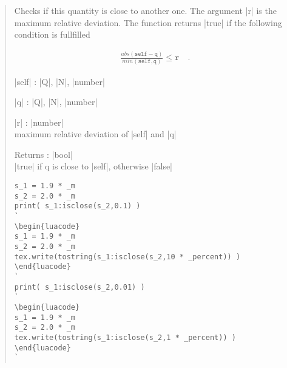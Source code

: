 \documentclass{ltxdoc}
\begin{document}
\begin{quote}
  Checks if this quantity is close to another one. The argument |r| is the maximum relative deviation. The function returns |true| if the following condition is fullfilled

  \begin{align*}
   \frac{abs(\texttt{self} - \texttt{q})}{min(\texttt{self},\texttt{q})} \leq \texttt{r} \quad.
  \end{align*}

  \begin{description}
  \item |self| : |Q|, |N|, |number|

  \item |q| : |Q|, |N|, |number| 

  \item |r| : |number|\\
    maximum relative deviation of |self| and |q|

  \item Returns : |bool|\\
    |true| if q is close to |self|, otherwise |false|
  \end{description}

\begin{lstlisting}
s_1 = 1.9 * _m
s_2 = 2.0 * _m
print( s_1:isclose(s_2,0.1) )
`
\begin{luacode}
s_1 = 1.9 * _m
s_2 = 2.0 * _m
tex.write(tostring(s_1:isclose(s_2,10 * _percent)) )
\end{luacode}
`
print( s_1:isclose(s_2,0.01) )
`
\begin{luacode}
s_1 = 1.9 * _m
s_2 = 2.0 * _m
tex.write(tostring(s_1:isclose(s_2,1 * _percent)) )
\end{luacode}
`
\end{lstlisting}

\end{quote}
\end{document}

